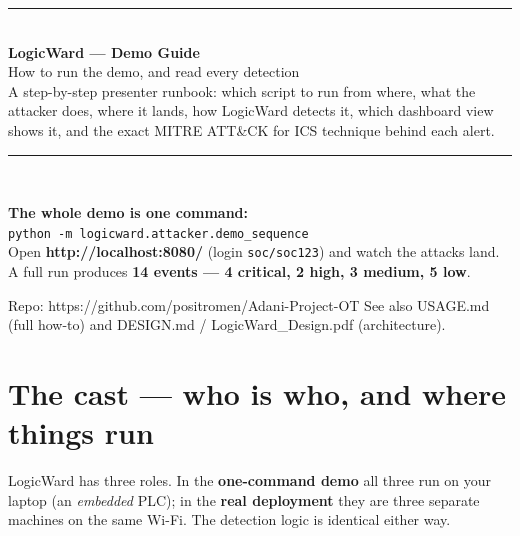 \documentclass[11pt,a4paper]{article}
\newcommand{\code}[1]{\texttt{\small #1}}
\begin{document}
\begin{titlepage}
\thispagestyle{empty}
\vspace*{1.4cm}
{\color{navy}\rule{\textwidth}{2.5pt}}\\[0.5cm]
{\Huge\bfseries\color{navy} LogicWard --- Demo Guide}\\[0.35cm]
{\LARGE\color{navy2} How to run the demo, and read every detection}\\[0.5cm]
{\large\color{ink} A step-by-step presenter runbook: which script to run from where,
what the attacker does, where it lands, how LogicWard detects it, which dashboard view
shows it, and the exact MITRE ATT\&CK for ICS technique behind each alert.}\\[0.4cm]
{\color{navy}\rule{\textwidth}{2.5pt}}\\[1.0cm]

\begin{note}
\large
\textbf{The whole demo is one command:}\\[4pt]
\code{python -m logicward.attacker.demo_sequence}\\[6pt]
Open \textbf{http://localhost:8080/} (login \code{soc/soc123}) and watch the attacks land.
A full run produces \textbf{14 events --- 4 critical, 2 high, 3 medium, 5 low}.
\end{note}

\vfill
{\small\color{muted} Repo: https://github.com/positromen/Adani-Project-OT \quad\textbullet\quad
See also USAGE.md (full how-to) and DESIGN.md / LogicWard\_Design.pdf (architecture).}
\end{titlepage}

\tableofcontents
\newpage

\section{The cast --- who is who, and where things run}

LogicWard has three roles. In the \textbf{one-command demo} all three run on your
laptop (an \emph{embedded} PLC); in the \textbf{real deployment} they are three separate
machines on the same Wi-Fi. The detection logic is identical either way.
\end{document}
